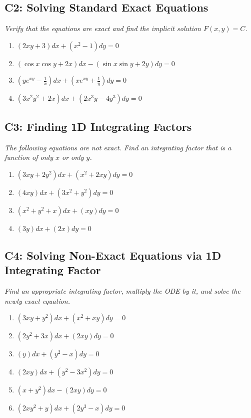 \documentclass[11pt]{article}
\begin{document}
\subsection*{C2: Solving Standard Exact Equations}
\textit{Verify that the equations are exact and find the implicit solution $F(x,y) = C$.}

\begin{enumerate}[resume]
    \item $(2xy + 3) dx + (x^2 - 1) dy = 0$
    \item $(\cos x \cos y + 2x) dx - (\sin x \sin y + 2y) dy = 0$
    \item $\left(y e^{xy} - \frac{1}{x}\right) dx + \left(x e^{xy} + \frac{1}{y}\right) dy = 0$
    \item $(3x^2 y^2 + 2x) dx + (2x^3 y - 4y^3) dy = 0$
\end{enumerate}

\subsection*{C3: Finding 1D Integrating Factors}
\textit{The following equations are not exact. Find an integrating factor that is a function of only $x$ or only $y$.}

\begin{enumerate}[resume]
    \item $(3xy + 2y^2) dx + (x^2 + 2xy) dy = 0$
    \item $(4xy) dx + (3x^2 + y^2) dy = 0$
    \item $(x^2 + y^2 + x) dx + (xy) dy = 0$
    \item $(3y) dx + (2x) dy = 0$
\end{enumerate}

\subsection*{C4: Solving Non-Exact Equations via 1D Integrating Factor}
\textit{Find an appropriate integrating factor, multiply the ODE by it, and solve the newly exact equation.}

\begin{enumerate}[resume]
    \item $(3xy + y^2) dx + (x^2 + xy) dy = 0$
    \item $(2y^2 + 3x) dx + (2xy) dy = 0$
    \item $(y) dx + (y^2 - x) dy = 0$
    \item $(2xy) dx + (y^2 - 3x^2) dy = 0$
    \item $(x + y^2) dx - (2xy) dy = 0$
    \item $(2xy^2 + y) dx + (2y^3 - x) dy = 0$
\end{enumerate}
\end{document}
